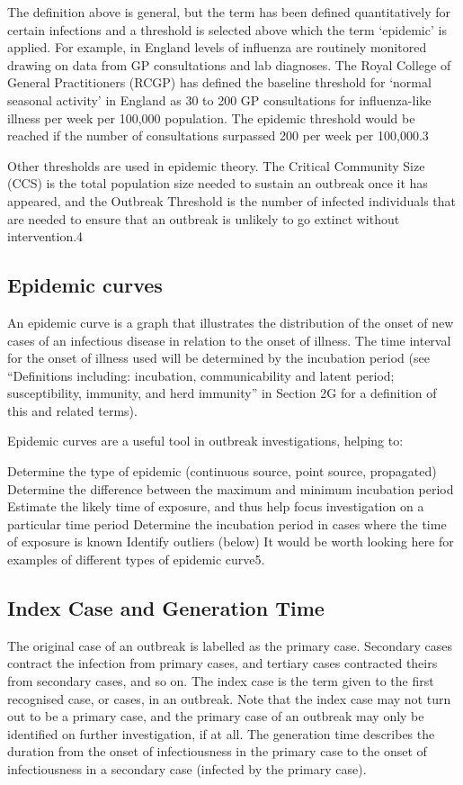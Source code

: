 \documentclass[fontsize=17pt]{article}
\begin{document}
The definition above is general, but the term has been defined quantitatively for certain infections and a threshold is selected above which the term ‘epidemic’ is applied. For example, in England levels of influenza are routinely monitored drawing on data from GP consultations and lab diagnoses. The Royal College of General Practitioners (RCGP) has defined the baseline threshold for ‘normal seasonal activity’ in England as 30 to 200 GP consultations for influenza-like illness per week per 100,000 population. The epidemic threshold would be reached if the number of consultations surpassed 200 per week per 100,000.3 

Other thresholds are used in epidemic theory. The Critical Community Size (CCS) is the total population size needed to sustain an outbreak once it has appeared, and the Outbreak Threshold is the number of infected individuals that are needed to ensure that an outbreak is unlikely to go extinct without intervention.4


\subsection{Epidemic curves}

An epidemic curve is a graph that illustrates the distribution of the onset of new cases of an infectious disease in relation to the onset of illness. The time interval for the onset of illness used will be determined by the incubation period (see “Definitions including: incubation, communicability and latent period; susceptibility, immunity, and herd immunity” in Section 2G for a definition of this and related terms).

Epidemic curves are a useful tool in outbreak investigations, helping to:

Determine the type of epidemic (continuous source, point source, propagated)
Determine the difference between the maximum and minimum incubation period
Estimate the likely time of exposure, and thus help focus investigation on a particular time period
Determine the incubation period in cases where the time of exposure is known
Identify outliers (below)
It would be worth looking here for examples of different types of epidemic curve5.


\subsection{Index Case and Generation Time}

The original case of an outbreak is labelled as the primary case. Secondary cases contract the infection from primary cases, and tertiary cases contracted theirs from secondary cases, and so on. The index case is the term given to the first recognised case, or cases, in an outbreak. Note that the index case may not turn out to be a primary case, and the primary case of an outbreak may only be identified on further investigation, if at all. The generation time describes the duration from the onset of infectiousness in the primary case to the onset of infectiousness in a secondary case (infected by the primary case).
\end{document}
